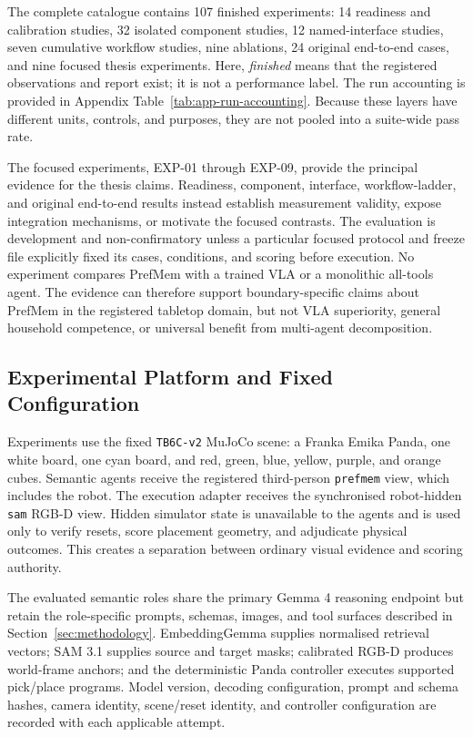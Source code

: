 \documentclass{article}
\begin{document}
The complete catalogue contains 107 finished experiments: 14 readiness and
calibration studies, 32 isolated component studies, 12 named-interface studies,
seven cumulative workflow studies, nine ablations, 24 original end-to-end
cases, and nine focused thesis experiments. Here, \emph{finished} means that
the registered observations and report exist; it is not a performance label.
The run accounting is provided in Appendix
Table~\ref{tab:app-run-accounting}. Because these layers have different units,
controls, and purposes, they are not pooled into a suite-wide pass rate.

The focused experiments, EXP-01 through EXP-09, provide the principal evidence
for the thesis claims. Readiness, component, interface, workflow-ladder, and
original end-to-end results instead establish measurement validity, expose
integration mechanisms, or motivate the focused contrasts. The evaluation is
development and non-confirmatory unless a particular focused protocol and
freeze file explicitly fixed its cases, conditions, and scoring before
execution. No experiment compares PrefMem with a trained VLA or a monolithic
all-tools agent. The evidence can therefore support boundary-specific claims
about PrefMem in the registered tabletop domain, but not VLA superiority,
general household competence, or universal benefit from multi-agent
decomposition.

\subsection{Experimental Platform and Fixed Configuration}
\label{subsec:evaluation-platform}

Experiments use the fixed \texttt{TB6C-v2} MuJoCo scene: a Franka Emika Panda,
one white board, one cyan board, and red, green, blue, yellow, purple, and orange
cubes. Semantic agents receive the registered third-person \texttt{prefmem}
view, which includes the robot. The execution adapter receives the synchronised
robot-hidden \texttt{sam} RGB-D view. Hidden simulator state is unavailable to
the agents and is used only to verify resets, score placement geometry, and
adjudicate physical outcomes. This creates a separation between ordinary visual
evidence and scoring authority.

The evaluated semantic roles share the primary Gemma 4 reasoning endpoint but
retain the role-specific prompts, schemas, images, and tool surfaces described
in Section~\ref{sec:methodology}. EmbeddingGemma supplies normalised retrieval
vectors; SAM 3.1 supplies source and target masks; calibrated RGB-D produces
world-frame anchors; and the deterministic Panda controller executes supported
pick/place programs. Model version, decoding configuration, prompt and schema
hashes, camera identity, scene/reset identity, and controller configuration are
recorded with each applicable attempt.
\end{document}

